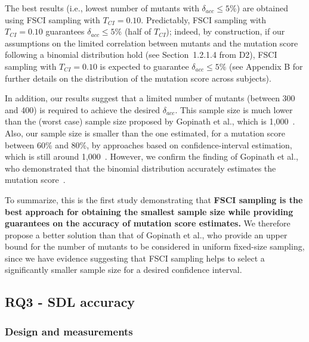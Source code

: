 The best results (i.e., lowest number of mutants with $\delta_{acc} \le 5\%$) are obtained using  FSCI sampling with $T_\mathit{CI}=0.10$. Predictably, FSCI sampling with $T_\mathit{CI}=0.10$ guarantees $\delta_{acc} \le 5\%$ (half of $T_\mathit{CI}$); indeed, by construction, if our assumptions 
on the limited correlation between mutants and the mutation score following a  binomial distribution hold (see Section~1.2.1.4 from D2),
FSCI sampling with $T_\mathit{CI}=0.10$ is expected to guarantee $\delta_{acc} \le 5\%$ (see Appendix
B
for further details on the distribution of the mutation score across subjects).

In addition, our results suggest that a limited number of mutants (between 300 and 400) is required to achieve the desired $\delta_{acc}$. This sample size is much lower than the (worst case) sample size proposed by Gopinath et al., which is 1,000~\cite{gopinath2015hard}. Also, our sample size is smaller 
than the one estimated, for a mutation score between 60\% and 80\%, by 
approaches
based on confidence-interval estimation, which is still around 1,000~\cite{Goncalves2012}. 
However, we confirm the finding of Gopinath et al., who demonstrated that the binomial distribution %
accurately estimates the mutation score~\cite{gopinath2015hard}.

To summarize, this is the first study demonstrating that \textbf{FSCI sampling is the 
best approach for obtaining the smallest sample size
while providing guarantees on the accuracy of mutation score estimates.} 
We therefore propose a better solution than that of Gopinath et al., who provide an upper bound for the number of mutants to be considered in uniform fixed-size sampling, since we have evidence suggesting that FSCI sampling helps to select a significantly smaller sample size for a desired confidence interval.





\subsection{RQ3 - SDL accuracy}



\subsubsection{Design and measurements}


